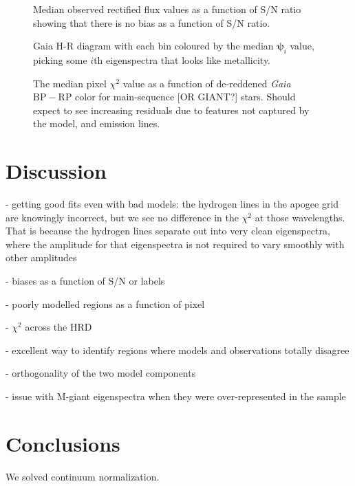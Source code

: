 \documentclass[modern]{aastex631}
\newcommand{\vecpsi}{\boldsymbol{\psi}}
\newcommand{\todo}[1]{\textcolor{tab:red}{#1}}
\begin{document}
\begin{figure}
    \caption{Median observed rectified flux values as a function of S/N ratio showing that there is no bias as a function of S/N ratio.}
\end{figure}


\begin{figure}
    \caption{Gaia H-R diagram with each bin coloured by the median $\vecpsi_i$ value, picking some $i$th eigenspectra that looks like metallicity. \label{fig:gaia_hrd_metallicity}}
\end{figure}


\begin{figure*}
    \caption{The median pixel $\chi^2$ value as a function of de-reddened \emph{Gaia} $\mathrm{BP} - \mathrm{RP}$ color for main-sequence [OR GIANT?] stars. \todo{Should expect to see increasing residuals due to features not captured by the model, and emission lines.}}
\end{figure*}


\section{Discussion}\label{sec:discussion}

- getting good fits even with bad models: the hydrogen lines in the apogee grid are knowingly incorrect, but we see no difference in the $\chi^2$ at those wavelengths. That is because the hydrogen lines separate out into very clean eigenspectra, where the amplitude for that eigenspectra is not required to vary smoothly with other amplitudes

- biases as a function of S/N or labels

- poorly modelled regions as a function of pixel

- $\chi^2$ across the HRD

- excellent way to identify regions where models and observations totally disagree

- orthogonality of the two model components

- issue with M-giant eigenspectra when they were over-represented in the sample

\section{Conclusions}
\label{sec:conclusions}

We solved continuum normalization.
\end{document}
